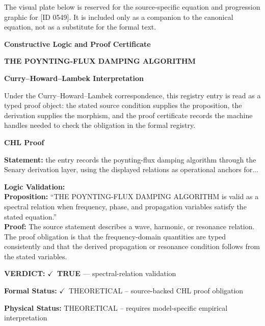 \begingroup\footnotesize\sloppy
The visual plate below is reserved for the source-specific equation and progression graphic for [ID 0549]. It is included only as a companion to the canonical equation, not as a substitute for the formal text.
\par\endgroup
\ifTZPDarkEdition
{}
\fi

\clearpage
\begingroup\tzpsupportsetup
\noindent\textbf{\fontsize{10.8pt}{12.8pt}\selectfont [ID 0549] Constructive Logic and Proof Certificate}\par
\noindent\textbf{\fontsize{10pt}{12pt}\selectfont THE POYNTING-FLUX DAMPING ALGORITHM}\par
\vspace{0.45em}
\begingroup
\footnotesize
\setlength{\parskip}{0.22em}
\setlength{\parindent}{0pt}
\noindent\textbf{Curry--Howard--Lambek Interpretation}\par
Under the Curry--Howard--Lambek correspondence, this registry entry is read as a typed proof
object: the stated source condition supplies the proposition, the derivation supplies the
morphism, and the proof certificate records the machine handles needed to check the obligation
in the formal registry.

\vspace{0.45em}
\noindent\textbf{CHL Proof}\par
\textbf{Statement:} the entry records the poynting-flux damping algorithm through the Senary derivation
layer, using the displayed relations as operational anchors for...

\textbf{Logic Validation:}\\
\textbf{Proposition:} ``THE POYNTING-FLUX DAMPING ALGORITHM is valid as a spectral relation when frequency,
phase, and propagation variables satisfy the stated equation.''\\
\textbf{Proof:} The source statement describes a wave, harmonic, or resonance relation. The proof
obligation is that the frequency-domain quantities are typed consistently and that the
derived propagation or resonance condition follows from the stated variables.

\textbf{VERDICT:} \ensuremath{\checkmark}\ \textbf{TRUE} --- spectral-relation validation

\textbf{Formal Status:} \ensuremath{\checkmark}\ THEORETICAL -- source-backed CHL proof obligation

\textbf{Physical Status:} THEORETICAL -- requires model-specific empirical interpretation
\par\vspace{0.45em}
\par
\ifTZPDarkEdition
{}
\fi
\endgroup
\endgroup
